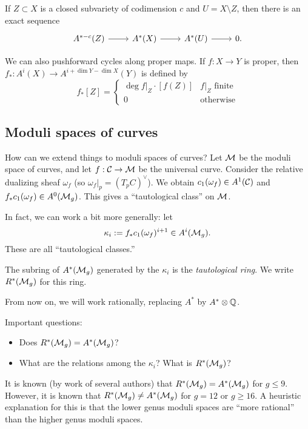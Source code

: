 \documentclass{amsart}
\begin{document}
\begin{thm}[Excision]
	If $Z \subset X$ is a closed subvariety of codimension $c$ and $U = X \setminus Z$, then there is an exact sequence
	\[
		\begin{tikzcd}
			A^{*-c}(Z) \rar & A^*(X) \rar & A^*(U) \rar & 0.
		\end{tikzcd}
	\]
\end{thm}

We can also pushforward cycles along proper maps.
If $f: X \to Y$ is proper, then $f_*: A^i(X) \to A^{i + \dim Y - \dim X}(Y)$ is defined by
\[
	f_* [Z] = \begin{cases}
		\deg f|_Z \cdot [f(Z)] & \textrm{$f|_Z$ finite} \\
		0 & \textrm{otherwise}
	\end{cases}
\]

\subsection{Moduli spaces of curves}

How can we extend things to moduli spaces of curves?
Let $\mathcal{M}$ be the moduli space of curves, and let $f: \mathcal{C} \to \mathcal{M}$ be the universal curve.
Consider the relative dualizing sheaf $\omega_f$ (so $\omega_f|_p = (T_p C)^\vee$).
We obtain $c_1(\omega_f) \in A^1(\mathcal{C})$ and $f_* c_1(\omega_f) \in A^0(\mathcal{M}_g)$.
This gives a ``tautological class'' on $\mathcal{M}$.

In fact, we can work a bit more generally: let
\[
	\kappa_i := f_* c_1(\omega_f)^{i+1} \in A^i(\mathcal{M}_g).
\]
These are all ``tautological classes.''

\begin{dfn}
	The subring of $A^*(\mathcal{M}_g)$ generated by the $\kappa_i$ is the \emph{tautological ring}.
	We write $R^*(\mathcal{M}_g)$ for this ring.
\end{dfn}

From now on, we will work rationally, replacing $A^*$ by $A^* \otimes \mathbb{Q}$.

Important questions:
\begin{itemize}
	\item Does $R^*(\mathcal{M}_g) = A^*(\mathcal{M}_g)$?
	\item What are the relations among the $\kappa_i$?
		What is $R^*(\mathcal{M}_g)$?
\end{itemize}

It is known (by work of several authors) that $R^*(\mathcal{M}_g) = A^*(\mathcal{M}_g)$ for $g \leq 9$.
However, it is known that $R^*(\mathcal{M}_g) \neq A^*(\mathcal{M}_g)$ for $g = 12$ or $g \geq 16$.
A heuristic explanation for this is that the lower genus moduli spaces are ``more rational'' than the higher genus moduli spaces.
\end{document}
